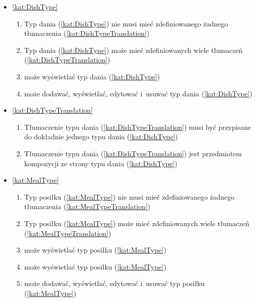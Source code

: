 \begin{itemize}[label={\textbf{Reguły dla}}, wide, labelwidth=!, labelindent=0pt]
\begin{enumerate}[label={\textbf{REG/3/\protect\twodigits{\arabic{enumi}}}}, wide, labelwidth=!, align=left, leftmargin=3cm, resume]
    \end{enumerate}
    \item\ref{kat:DishType}\mynobreakpar
    \begin{enumerate}[label={\textbf{REG/3/\protect\twodigits{\arabic{enumi}}}}, wide, labelwidth=!, align=left, leftmargin=3cm, resume]
        \item Typ dania (\ref{kat:DishType}) nie musi mieć zdefiniowanego żadnego tłumaczenia (\ref{kat:DishTypeTranslation})
        \item Typ dania (\ref{kat:DishType}) może mieć zdefiniowanych wiele tłumaczeń (\ref{kat:DishTypeTranslation})
        \item {} może wyświetlać typ dania (\ref{kat:DishType})
        \item {} może dodawać, wyświetlać, edytować i~usuwać typ dania (\ref{kat:DishType})
    \end{enumerate}
    \item\ref{kat:DishTypeTranslation}\mynobreakpar
    \begin{enumerate}[label={\textbf{REG/3/\protect\twodigits{\arabic{enumi}}}}, wide, labelwidth=!, align=left, leftmargin=3cm, resume]
        \item Tłumaczenie typu dania (\ref{kat:DishTypeTranslation}) musi być przypisane do dokładnie jednego typu dania (\ref{kat:DishType})
        \item Tłumaczenie typu dania (\ref{kat:DishTypeTranslation}) jest przedmiotem kompozycji ze strony typu dania (\ref{kat:DishType})
    \end{enumerate}
    \item\ref{kat:MealType}\mynobreakpar
    \begin{enumerate}[label={\textbf{REG/3/\protect\twodigits{\arabic{enumi}}}}, wide, labelwidth=!, align=left, leftmargin=3cm, resume]
        \item Typ posiłku (\ref{kat:MealType}) nie musi mieć zdefiniowanego żadnego tłumaczenia (\ref{kat:MealTypeTranslation})
        \item Typ posiłku (\ref{kat:MealType}) może mieć zdefiniowanych wiele tłumaczeń (\ref{kat:MealTypeTranslation})
        \item {} może wyświetlać typ posiłku (\ref{kat:MealType})
        \item {} może wyświetlać typ posiłku (\ref{kat:MealType})
        \item {} może dodawać, wyświetlać, edytować i~usuwać typ posiłku (\ref{kat:MealType})

\end{enumerate}
\end{itemize}

